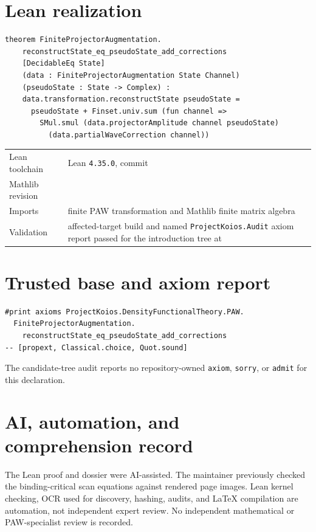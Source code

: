 \section{Lean realization}
\begin{lstlisting}
theorem FiniteProjectorAugmentation.
    reconstructState_eq_pseudoState_add_corrections
    [DecidableEq State]
    (data : FiniteProjectorAugmentation State Channel)
    (pseudoState : State -> Complex) :
    data.transformation.reconstructState pseudoState =
      pseudoState + Finset.univ.sum (fun channel =>
        SMul.smul (data.projectorAmplitude channel pseudoState)
          (data.partialWaveCorrection channel))
\end{lstlisting}
\begin{tabularx}{\textwidth}{@{}lY@{}}
\toprule
Lean toolchain & Lean \texttt{4.35.0}, commit  \\
Mathlib revision &  \\
Imports & finite PAW transformation and Mathlib finite matrix algebra \\
Validation & affected-target build and named \texttt{ProjectKoios.Audit} axiom report passed for the introduction tree at  \\
\bottomrule
\end{tabularx}

\section{Trusted base and axiom report}
\begin{lstlisting}
#print axioms ProjectKoios.DensityFunctionalTheory.PAW.
  FiniteProjectorAugmentation.
    reconstructState_eq_pseudoState_add_corrections
-- [propext, Classical.choice, Quot.sound]
\end{lstlisting}
The candidate-tree audit reports no repository-owned \texttt{axiom}, \texttt{sorry}, or
\texttt{admit} for this declaration.

\section{AI, automation, and comprehension record}
The Lean proof and dossier were AI-assisted.  The maintainer previously checked the binding-critical
scan equations against rendered page images.  Lean kernel checking, OCR used for discovery, hashing,
audits, and LaTeX compilation are automation, not independent expert review.  No independent
mathematical or PAW-specialist review is recorded.

